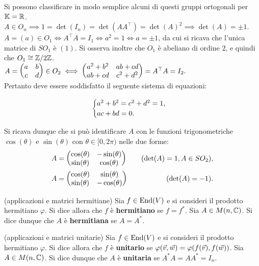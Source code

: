 \begin{remark}
	Si possono classificare in modo semplice alcuni di questi gruppi ortogonali per $\mathbb{K} = \mathbb R$. \\
	
	\li $A \in O_n \implies 1 = \det(I_n) = \det(A A^\top) = \det(A)^2 \implies \det(A) = \pm 1$.
	\li $A = (a) \in O_1 \iff A^\top A = I_1 \iff a^2 = 1 \iff a = \pm 1$, da cui si ricava che l'unica matrice
	di $SO_1$ è $(1)$. Si osserva inoltre che $O_1$ è abeliano di ordine $2$, e quindi che $O_1 \cong \mathbb Z/2\mathbb Z$. \\
	\li $A = \begin{pmatrix} a & b \\ c & d \end{pmatrix} \in O_2 \iff \begin{pmatrix} a^2 + b^2 & ab + cd \\ ab + cd & c^2 + d^2 \end{pmatrix} = A^\top A = I_2.$ \\
	
	Pertanto deve essere soddisfatto il seguente sistema di equazioni:
	
	\[ \begin{cases} a^2 + b^2 = c^2 + d^2 = 1, \\ ac + bd = 0. \end{cases} \]
	
	Si ricava dunque che si può identificare
	$A$ con le funzioni trigonometriche $\cos(\theta)$ e $\sin(\theta)$ con $\theta \in [0, 2\pi)$ nelle due forme:
	\begin{align*}
		&A = \begin{pmatrix} \cos(\theta) & -\sin(\theta) \\ \sin(\theta) & \cos(\theta) \end{pmatrix} \quad &\text{(}\!\det(A) = 1, A \in SO_2\text{)}, \\
		&A = \begin{pmatrix} \cos(\theta) & \sin(\theta) \\ \sin(\theta) & -\cos(\theta) \end{pmatrix} \quad &\text{(}\!\det(A) = -1\text{)}.
	\end{align*}
\end{remark}

\begin{definition} (applicazioni e matrici hermitiane)
	Sia $f \in \operatorname{End}(V)$ e si consideri il prodotto hermitiano $\varphi$. Si dice allora che
	$f$ è \textbf{hermitiano} se $f = f^*$. Sia $A \in M(n, \mathbb C)$. Si dice dunque che $A$
	è \textbf{hermitiana} se $A = A^*$.
\end{definition}

\begin{definition} (applicazioni e matrici unitarie)
	Sia $f \in \operatorname{End}(V)$ e si consideri il prodotto hermitiano $\varphi$. Si dice allora che
	$f$ è \textbf{unitario} se $\varphi(\v, \w) = \varphi(f(\v), f(\w))$. Sia $A \in M(n, \mathbb C)$.
	Si dice dunque che $A$ è \textbf{unitaria} se $A^* A = A A^* = I_n$.
\end{definition}

